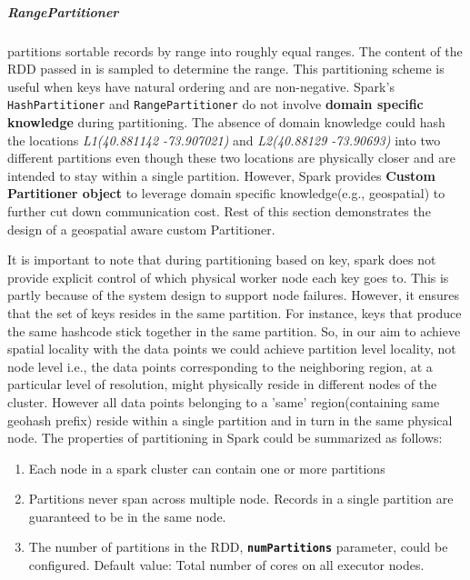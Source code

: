 \documentclass[article,type=msc,colorback,12pt,accentcolor=tud1d]{tudthesis}
\begin{document}
			\subparagraph{RangePartitioner} partitions sortable records by range into roughly equal ranges. The content of the RDD passed in is sampled to determine the range\cite{sparkapiPartitioner}. This partitioning scheme is useful when keys have natural ordering and are non-negative.
			\clearpage
			Spark's \texttt{HashPartitioner} and \texttt{RangePartitioner} do not involve \textbf{domain specific knowledge} during partitioning. The absence of domain knowledge could hash the locations \textit{L1(40.881142 -73.907021)} and \textit{L2(40.88129 -73.90693)} into two different partitions even though these two locations are physically closer and are intended to stay within a single partition. However, Spark provides \textbf{Custom Partitioner object} to leverage domain specific knowledge(e.g., geospatial) to further cut down communication cost. Rest of this section demonstrates the design of a geospatial aware custom Partitioner.
			
			\par It is important to note that during partitioning based on key, spark does not provide explicit control of which physical worker node each key goes to. This is partly because of the system design to support node failures.\cite{sparkbook} However, it ensures that the set of keys resides in the same partition. For instance, keys that produce the same hashcode stick together  in the same partition. So, in our aim to achieve spatial locality with the data points we could achieve partition level locality, not node level i.e., the data points corresponding to the neighboring region, at a particular level of resolution, might physically reside in different nodes of the cluster. However all data points belonging to a 'same' region(containing same geohash prefix) reside within a single partition and in turn in the same physical node. The properties of partitioning in Spark could be summarized as follows: \cite{partitioningHeather} 
			 
			 \begin{enumerate}
				 \item Each node in a spark cluster can contain one or more partitions
				 \item Partitions never span across multiple node. Records in a single partition are guaranteed to be in the same node.
				\item  The number of partitions in the RDD, \texttt{\textbf{numPartitions}} parameter, could be configured. Default value: Total number of cores on all executor nodes.
			 \end{enumerate}
			
\end{document}
